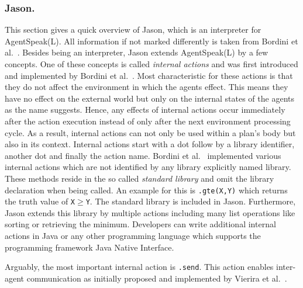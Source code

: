 \subsubsection{Jason.}
This section gives a quick overview of Jason, which is an interpreter for AgentSpeak(L). All information if not marked differently is taken from Bordini et al.~\cite{bordini_jason_2005}. Besides being an interpreter, Jason extends AgentSpeak(L) by a few concepts. One of these concepts is called \emph{internal actions} and was first introduced and implemented by Bordini et al.~\cite{bordini_agentspeak_2002}. Most characteristic for these actions is that they do not affect the environment in which the agents effect. This means they have no effect on the external world but only on the internal states of the agents as the name suggests. Hence, any effects of internal actions occur immediately after the action execution instead of only after the next environment processing cycle. As a result, internal actions can not only be used within a plan's body but also in its context. %
Internal actions start with a dot follow by a library identifier, another dot and finally the action name. Bordini et al.~\cite{bordini_agentspeak_2002} implemented various internal actions which are not identified by any library explicitly named library. These methods reside in the so called \emph{standard library} and omit the library declaration when being called. An example for this is \texttt{.gte(X,Y)} which returns the truth value of \texttt{X}$\geq$\texttt{Y}. The standard library is included in Jason. Furthermore, Jason extends this library by multiple actions including many list operations like sorting or retrieving the minimum. Developers can write additional internal actions in Java or any other programming language which supports the programming framework Java Native Interface. %

Arguably, the most important  internal action is \texttt{.send}. This action enables inter-agent communication as initially proposed and implemented by Vierira et al.~\cite{vieira_formal_2007}.
